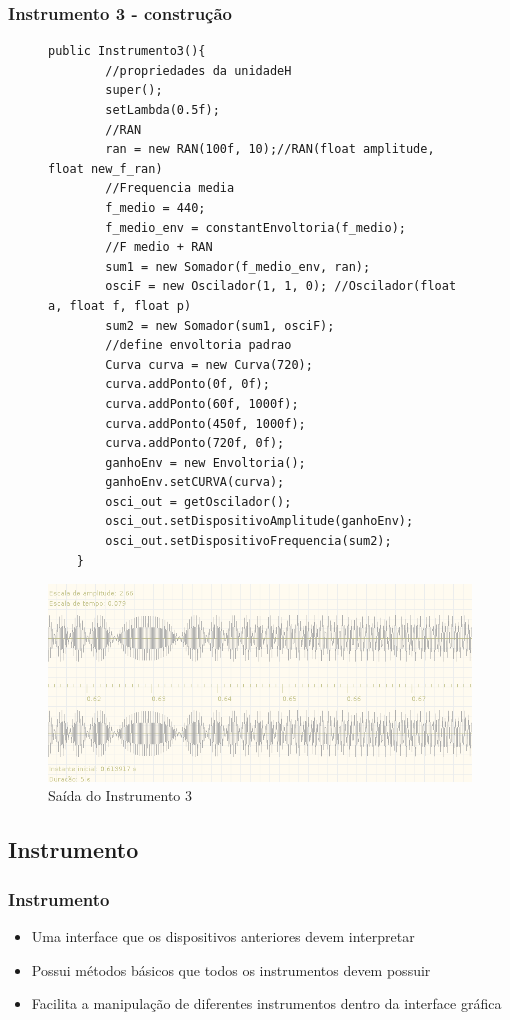 \documentclass{beamer}
\begin{document}
 \begin{frame}[fragile]
 \frametitle{Instrumento 3 - construção}
 \begin{figure}
 	\centering
 	\begin{lstlisting}
public Instrumento3(){
		//propriedades da unidadeH
		super();
		setLambda(0.5f);
		//RAN
		ran = new RAN(100f, 10);//RAN(float amplitude, float new_f_ran)		
		//Frequencia media
		f_medio = 440;
		f_medio_env = constantEnvoltoria(f_medio);
		//F medio + RAN
		sum1 = new Somador(f_medio_env, ran);
		osciF = new Oscilador(1, 1, 0); //Oscilador(float a, float f, float p) 
		sum2 = new Somador(sum1, osciF);
		//define envoltoria padrao
		Curva curva = new Curva(720);
		curva.addPonto(0f, 0f);
		curva.addPonto(60f, 1000f);
		curva.addPonto(450f, 1000f);
		curva.addPonto(720f, 0f);
		ganhoEnv = new Envoltoria();
		ganhoEnv.setCURVA(curva);
		osci_out = getOscilador();
		osci_out.setDispositivoAmplitude(ganhoEnv);
		osci_out.setDispositivoFrequencia(sum2);
	}    			\end{lstlisting}
	\caption{}	
	\end{figure}
\end{frame}


\begin{frame}
 \begin{figure}
  \includegraphics[scale=0.4]{./images/ins3.png}
  \caption{Saída do Instrumento 3}
 \end{figure} 
\end{frame}

\subsection{Instrumento}
\begin{frame}
 \frametitle{Instrumento}
 \begin{itemize}
 \item Uma interface que os dispositivos anteriores devem interpretar
 \item Possui métodos básicos que todos os instrumentos devem possuir
 \item Facilita a manipulação de diferentes instrumentos dentro da interface gráfica
 \end{itemize}
\end{frame}
\end{document}
